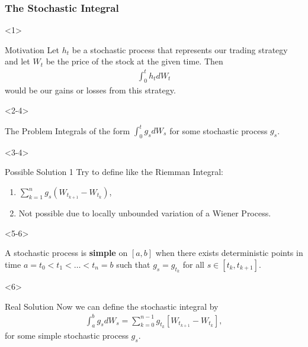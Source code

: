 \documentclass[10pt]{beamer}
\begin{document}
\begin{frame}[t]
  \frametitle{The Stochastic Integral}
  \begin{onlyenv}<1>
    \begin{block}{Motivation}
      Let $h_t$ be a stochastic process that represents our trading strategy and let $W_t$ be the price of the stock at the given time. Then
      \begin{align*}
        \displaystyle\int_{0}^{t} h_t dW_t
      \end{align*}
      would be our gains or losses from this strategy.
    \end{block}
  \end{onlyenv}
  \begin{onlyenv}<2-4>
    \begin{block}{The Problem}
      Integrals of the form $\displaystyle\int_{0}^{t}g_s dW_s$ for some stochastic process $g_s$.
    \end{block}
  \end{onlyenv}
  \begin{onlyenv}<3-4>
    \begin{block}{Possible Solution 1}
      Try to define like the Riemman Integral:
      \begin{enumerate}
        \item<3-> $\displaystyle\sum_{k = 1}^{n}g_s(W_{t_{k+1}} - W_{t_{k}})$,
        \item<4-> Not possible due to locally unbounded variation of a Wiener Process.
      \end{enumerate}
    \end{block}
  \end{onlyenv}
  \begin{onlyenv}<5-6>
    \begin{definition}
      A stochastic process is \textbf{simple} on $[a,b]$ when there exists deterministic points in time $a = t_0 < t_1 < \dots < t_n = b$ such that $g_s = g_{t_k}$ for all $s \in [t_k, t_{k+1}]$.
    \end{definition}
  \end{onlyenv}
  \begin{onlyenv}<6>
      \begin{block}{Real Solution}
        Now we can define the stochastic integral by
        \begin{align*}
          \displaystyle\int_{a}^{b}g_s dW_s = \displaystyle\sum_{k = 0}^{n - 1}g_{t_k}[W_{t_{k+1}} - W_{t_{k}}],
        \end{align*}
        for some simple stochastic process $g_s$.

\end{block}
\end{onlyenv}
\end{frame}
\end{document}
